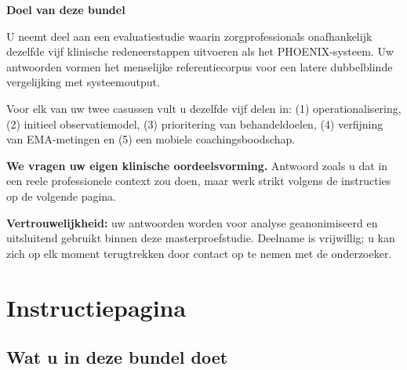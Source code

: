 \documentclass[11pt,a4paper]{article}
\begin{document}
\begin{titlepage}
\vspace{0.5cm}

\begin{tcolorbox}[
  colback=SoftBG,colframe=BorderGrey,
  arc=2mm,left=10pt,right=10pt,top=9pt,bottom=9pt,
  width=0.92\textwidth
]
\textbf{\color{PrimaryBlue}Doel van deze bundel}

\medskip\small
U neemt deel aan een evaluatiestudie waarin zorgprofessionals onafhankelijk dezelfde
vijf klinische redeneerstappen uitvoeren als het PHOENIX-systeem. Uw antwoorden
vormen het menselijke referentiecorpus voor een latere dubbelblinde vergelijking
met systeemoutput.

\medskip
Voor elk van uw twee casussen vult u dezelfde vijf delen in: (1) operationalisering,
(2) initieel observatiemodel, (3) prioritering van behandeldoelen, (4) verfijning van
EMA-metingen en (5) een mobiele coachingsboodschap.

\medskip
\textbf{We vragen uw eigen klinische oordeelsvorming.} Antwoord zoals u dat in een
reele professionele context zou doen, maar werk strikt volgens de instructies op de
volgende pagina.
\end{tcolorbox}

\vspace{0.5cm}

\begin{tcolorbox}[
  colback=AccentAmber,colframe=GoldAmber,
  arc=2mm,boxrule=0.7pt,left=10pt,right=10pt,top=8pt,bottom=8pt,
  width=0.90\textwidth
]
\small\centering
\textbf{\color{GoldAmber}Vertrouwelijkheid:} uw antwoorden worden voor analyse
geanonimiseerd en uitsluitend gebruikt binnen deze masterproefstudie. Deelname is
vrijwillig; u kan zich op elk moment terugtrekken door contact op te nemen met de
onderzoeker.
\end{tcolorbox}

\vfill
\end{titlepage}

\newpage
\tableofcontents
\newpage


\section{Instructiepagina}

\subsection{Wat u in deze bundel doet}
\end{document}
